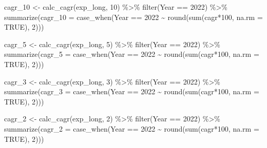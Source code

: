 \documentclass[
  letterpaper,
  DIV=11,
  numbers=noendperiod]{scrreport}
\newenvironment{Shaded}{\begin{snugshade}}{\end{snugshade}}
\newcommand{\AttributeTok}[1]{\textcolor[rgb]{0.40,0.45,0.13}{#1}}
\newcommand{\ConstantTok}[1]{\textcolor[rgb]{0.56,0.35,0.01}{#1}}
\newcommand{\DecValTok}[1]{\textcolor[rgb]{0.68,0.00,0.00}{#1}}
\newcommand{\FunctionTok}[1]{\textcolor[rgb]{0.28,0.35,0.67}{#1}}
\newcommand{\NormalTok}[1]{\textcolor[rgb]{0.00,0.23,0.31}{#1}}
\newcommand{\OtherTok}[1]{\textcolor[rgb]{0.00,0.23,0.31}{#1}}
\newcommand{\SpecialCharTok}[1]{\textcolor[rgb]{0.37,0.37,0.37}{#1}}
\begin{document}
\begin{Shaded}
\begin{Highlighting}[]
\NormalTok{cagr\_10 }\OtherTok{\textless{}{-}} \FunctionTok{calc\_cagr}\NormalTok{(exp\_long, }\DecValTok{10}\NormalTok{) }\SpecialCharTok{\%\textgreater{}\%} 
  \FunctionTok{filter}\NormalTok{(Year }\SpecialCharTok{==} \DecValTok{2022}\NormalTok{) }\SpecialCharTok{\%\textgreater{}\%}
  \FunctionTok{summarize}\NormalTok{(}\AttributeTok{cagr\_10 =} \FunctionTok{case\_when}\NormalTok{(Year }\SpecialCharTok{==} \DecValTok{2022} \SpecialCharTok{\textasciitilde{}} \FunctionTok{round}\NormalTok{(}\FunctionTok{sum}\NormalTok{(cagr}\SpecialCharTok{*}\DecValTok{100}\NormalTok{, }\AttributeTok{na.rm =} \ConstantTok{TRUE}\NormalTok{), }\DecValTok{2}\NormalTok{)))}

\NormalTok{cagr\_5 }\OtherTok{\textless{}{-}} \FunctionTok{calc\_cagr}\NormalTok{(exp\_long, }\DecValTok{5}\NormalTok{) }\SpecialCharTok{\%\textgreater{}\%} 
  \FunctionTok{filter}\NormalTok{(Year }\SpecialCharTok{==} \DecValTok{2022}\NormalTok{) }\SpecialCharTok{\%\textgreater{}\%}
  \FunctionTok{summarize}\NormalTok{(}\AttributeTok{cagr\_5 =} \FunctionTok{case\_when}\NormalTok{(Year }\SpecialCharTok{==} \DecValTok{2022} \SpecialCharTok{\textasciitilde{}} \FunctionTok{round}\NormalTok{(}\FunctionTok{sum}\NormalTok{(cagr}\SpecialCharTok{*}\DecValTok{100}\NormalTok{, }\AttributeTok{na.rm =} \ConstantTok{TRUE}\NormalTok{), }\DecValTok{2}\NormalTok{)))}

\NormalTok{cagr\_3 }\OtherTok{\textless{}{-}} \FunctionTok{calc\_cagr}\NormalTok{(exp\_long, }\DecValTok{3}\NormalTok{) }\SpecialCharTok{\%\textgreater{}\%} 
  \FunctionTok{filter}\NormalTok{(Year }\SpecialCharTok{==} \DecValTok{2022}\NormalTok{) }\SpecialCharTok{\%\textgreater{}\%}
  \FunctionTok{summarize}\NormalTok{(}\AttributeTok{cagr\_3 =} \FunctionTok{case\_when}\NormalTok{(Year }\SpecialCharTok{==} \DecValTok{2022} \SpecialCharTok{\textasciitilde{}} \FunctionTok{round}\NormalTok{(}\FunctionTok{sum}\NormalTok{(cagr}\SpecialCharTok{*}\DecValTok{100}\NormalTok{, }\AttributeTok{na.rm =} \ConstantTok{TRUE}\NormalTok{), }\DecValTok{2}\NormalTok{)))}

\NormalTok{cagr\_2 }\OtherTok{\textless{}{-}} \FunctionTok{calc\_cagr}\NormalTok{(exp\_long, }\DecValTok{2}\NormalTok{) }\SpecialCharTok{\%\textgreater{}\%} 
  \FunctionTok{filter}\NormalTok{(Year }\SpecialCharTok{==} \DecValTok{2022}\NormalTok{) }\SpecialCharTok{\%\textgreater{}\%}
  \FunctionTok{summarize}\NormalTok{(}\AttributeTok{cagr\_2 =} \FunctionTok{case\_when}\NormalTok{(Year }\SpecialCharTok{==} \DecValTok{2022} \SpecialCharTok{\textasciitilde{}} \FunctionTok{round}\NormalTok{(}\FunctionTok{sum}\NormalTok{(cagr}\SpecialCharTok{*}\DecValTok{100}\NormalTok{, }\AttributeTok{na.rm =} \ConstantTok{TRUE}\NormalTok{), }\DecValTok{2}\NormalTok{)))}


\end{Highlighting}
\end{Shaded}
\end{document}
